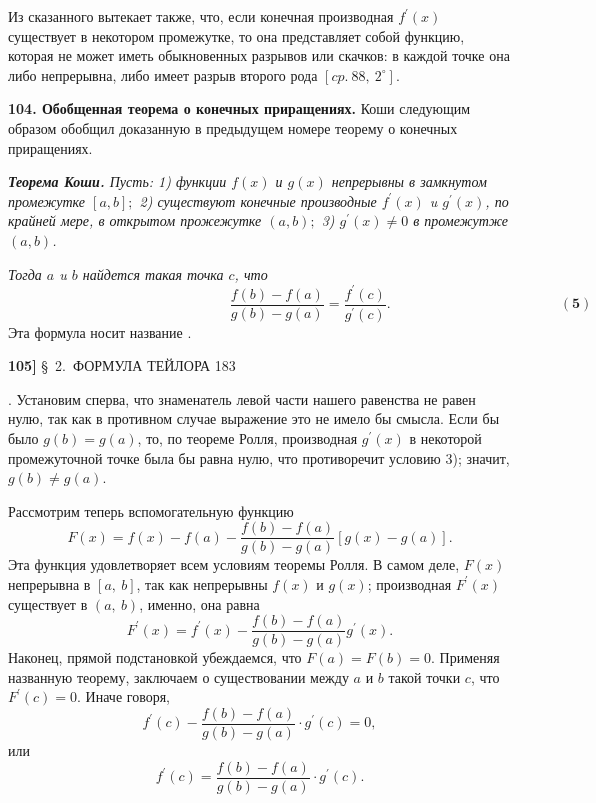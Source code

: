 \documentclass{book}
\begin{document}
Из сказанного вытекает также, что, если конечная производная $f^{\prime}(x)$ существует в некотором промежутке, то она представляет собой функцию, которая не может иметь обыкновенных разрывов или скачков: в каждой точке она либо непрерывна, либо имеет разрыв второго рода $\left[cp.\ 88, \ 2^{\circ}\right]$.

\smallskip

\textbf{104. Обобщенная теорема о конечных приращениях.} Коши следующим образом обобщил доказанную в предыдущем номере теорему о конечных приращениях.

\textit{\textbf{Теорема Коши.} Пусть: 1) функции $f(x)$ и $g(x)$ непрерывны в замкнутом промежутке $[a, b];$ 2) существуют конечные производные $f^{\prime}(x)$ u $g^{\prime}(x)$, по крайней мере, в открытом прожежутке $(a, b);$ 3) $g^{\prime}(x)\neq0$ в промежутже $(a, b)$.}

\textit{Тогда  $a$ u $b$ найдется такая точка $c$, что}
$$
	\hspace{190pt} \frac{f(b)-f(a)}{g(b)-g(a)}=\frac{f^{\prime}(c)}{g^{\prime}(c)}. \hspace{145pt} (\textbf{5})
$$
\noindent Эта формула носит название .

\newpage
\begin{flushleft}
	\textbf{105]}
	\hspace{145pt}
	{\normalsize
		\S \ 2.\ ФОРМУЛА ТЕЙЛОРА}
	\hspace{145pt}
	183\\
\end{flushleft}

. Установим сперва, что знаменатель левой части нашего равенства не равен нулю, так как в противном случае выражение это не имело бы смысла. Если бы было $g(b)=g(a)$, то, по теореме Ролля, производная $g^{\prime}(x)$ в некоторой промежуточной точке была бы равна нулю, что противоречит условию 3); значит, $g(b) \neq g(a)$.

Рассмотрим теперь вспомогательную функцию
$$
	F(x)=f(x)-f(a)-\frac{f(b)-f(a)}{g(b)-g(a)}[g(x)-g(a)].
$$
Эта функция удовлетворяет всем условиям теоремы Ролля. В самом деле, $F(x)$ непрерывна в $[a, \ b]$, так как непрерывны $f(x)$ и $g(x)$; производная $F^{\prime}(x)$ существует в $(a, \ b)$, именно, она равна
$$
	F^{\prime}(x)=f^{\prime}(x)-\frac{f(b)-f(a)}{g(b)-g(a)} g^{\prime}(x).
$$
Наконец, прямой подстановкой убеждаемся, что $F(a)=F(b)=0$. Применяя названную теорему, заключаем о существовании между $a$ и $b$ такой точки $c$, что $F^{\prime}(c)=0$. Иначе говоря,
$$
	f^{\prime}(c)-\frac{f(b)-f(a)}{g(b)-g(a)} \cdot g^{\prime}(c)=0,
$$
или
$$
	f^{\prime}(c)=\frac{f(b)-f(a)}{g(b)-g(a)} \cdot g^{\prime}(c).
$$
\end{document}
